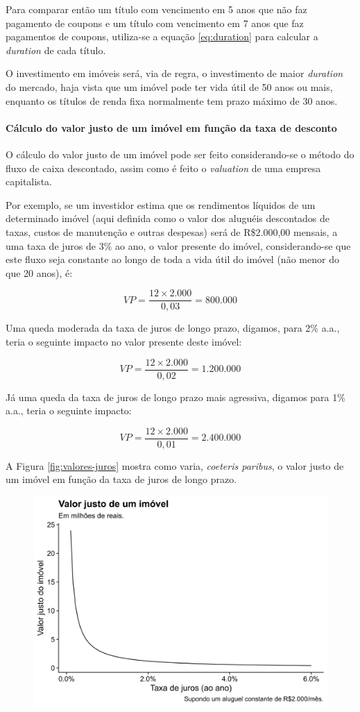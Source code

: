 \documentclass[
	12pt,				%
	oneside,			%
	a4paper,			%
	chapter=TITLE,		%
	section=TITLE,		%
	english,			%
	brazil				%
	]{abntex2}
\begin{document}
\begin{refsection}
Para comparar então um título com vencimento em 5 anos que não faz pagamento de
coupons e um título com vencimento em 7 anos que faz pagamentos de coupons,
utiliza-se a equação \eqref{eq:duration} para calcular a \emph{duration} de cada
título.

O investimento em imóveis será, via de regra, o investimento de maior \emph{duration}
do mercado, haja vista que um imóvel pode ter vida útil de 50 anos ou mais,
enquanto os títulos de renda fixa normalmente tem prazo máximo de 30 anos.

\hypertarget{cuxe1lculo-do-valor-justo-de-um-imuxf3vel-em-funuxe7uxe3o-da-taxa-de-desconto}{%
\paragraph{Cálculo do valor justo de um imóvel em função da taxa de desconto}\label{cuxe1lculo-do-valor-justo-de-um-imuxf3vel-em-funuxe7uxe3o-da-taxa-de-desconto}}

O cálculo do valor justo de um imóvel pode ser feito considerando-se o método
do fluxo de caixa descontado, assim como é feito o \emph{valuation} de uma empresa
capitalista.

Por exemplo, se um investidor estima que os rendimentos líquidos de um
determinado imóvel (aqui definida como o valor dos aluguéis descontados de
taxas, custos de manutenção e outras despesas) será de R\$2.000,00 mensais, a uma
taxa de juros de 3\% ao ano, o valor presente do imóvel, considerando-se que este
fluxo seja constante ao longo de toda a vida útil do imóvel (não menor do que 20
anos), é:

\[VP = \frac{12 \times 2.000}{0,03} = 800.000\]

Uma queda moderada da taxa de juros de longo prazo, digamos, para 2\% a.a.,
teria o seguinte impacto no valor presente deste imóvel:

\[VP = \frac{12 \times 2.000}{0,02} = 1.200.000\]

Já uma queda da taxa de juros de longo prazo mais agressiva, digamos para 1\%
a.a., teria o seguinte impacto:

\[VP = \frac{12 \times 2.000}{0,01} = 2.400.000\]

A Figura \ref{fig:valores-juros} mostra como varia, \emph{coeteris paribus}, o valor
justo de um imóvel em função da taxa de juros de longo prazo.
\begin{figure}[H]

{\centering \includegraphics[width=0.7\linewidth]{images/valores-juros-1} 

}
\end{figure}
\end{refsection}
\end{document}
